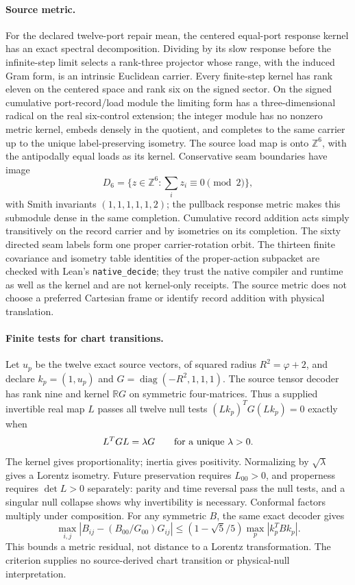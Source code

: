 \documentclass[11pt]{article}
\begin{document}
\paragraph{Source metric.}
For the declared twelve-port repair mean, the centered equal-port response
kernel has an exact spectral decomposition. Dividing by its slow response
before the infinite-step limit selects a rank-three projector whose range,
with the induced Gram form, is an intrinsic Euclidean carrier. Every
finite-step kernel has rank eleven on the centered space and rank six on the
signed sector. On the signed cumulative port-record/load module the limiting
form has a three-dimensional radical on the real six-control extension; the
integer module has no nonzero metric kernel, embeds densely in the quotient,
and completes to the same carrier up to the unique label-preserving isometry.
The source load map is onto \(\mathbb Z^6\), with the antipodally equal loads
as its kernel. Conservative seam boundaries have image
\[
 D_6=\{z\in\mathbb Z^6:\textstyle\sum_i z_i\equiv0\pmod 2\},
\]
with Smith invariants \((1,1,1,1,1,2)\); the pullback response metric makes
this submodule dense in the same completion. Cumulative record addition acts
simply transitively on the record carrier and by isometries on its
completion. The sixty directed seam labels form one proper carrier-rotation
orbit. The thirteen finite covariance and isometry table identities of the
proper-action subpacket are checked with Lean's \texttt{native\_decide}; they
trust the native compiler and runtime as well as the kernel and are not
kernel-only receipts. The source metric does not choose a preferred Cartesian
frame or identify record addition with physical translation.

\paragraph{Finite tests for chart transitions.}
Let $u_p$ be the twelve exact source vectors, of squared radius
$R^2=\varphi+2$, and declare $k_p=(1,u_p)$ and
$G=\operatorname{diag}(-R^2,1,1,1)$. The source tensor decoder has rank nine
and kernel $\mathbb RG$ on symmetric four-matrices. Thus a supplied invertible
real map $L$ passes all twelve null tests $(Lk_p)^TG(Lk_p)=0$ exactly when
\[
 L^TGL=\lambda G\qquad\hbox{for a unique }\lambda>0.
\]
The kernel gives proportionality; inertia gives positivity. Normalizing by
$\sqrt\lambda$ gives a Lorentz isometry. Future preservation requires
$L_{00}>0$, and properness requires $\det L>0$ separately: parity and time
reversal pass the null tests, and a singular null collapse shows why
invertibility is necessary. Conformal factors multiply under composition.
For any symmetric $B$, the same exact decoder gives
\[
 \max_{i,j}|B_{ij}-(B_{00}/G_{00})G_{ij}|
 \leq(1-\sqrt5/5)\max_p|k_p^TBk_p|.
\]
This bounds a metric residual, not distance to a Lorentz transformation.
The criterion supplies no source-derived chart transition or physical-null
interpretation.
\end{document}
